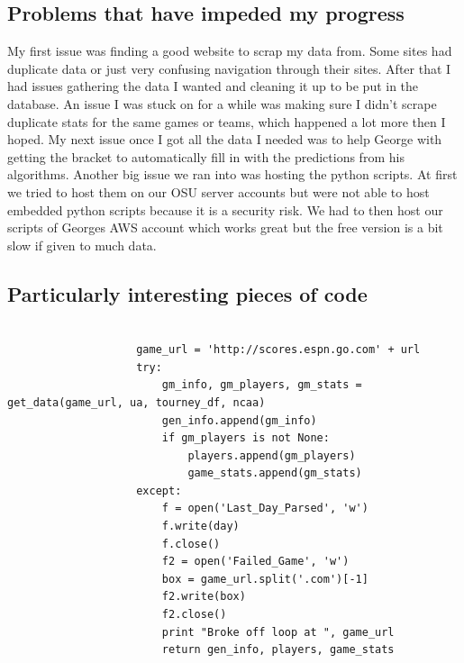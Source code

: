 \documentclass[onecolumn, draftclsnofoot,10pt, compsoc]{IEEEtran}
\begin{document}
\subsection{Problems that have impeded my progress}
My first issue was finding a good website to scrap my data from. Some sites had duplicate data or just very confusing navigation through their sites. After that I had issues gathering the data I wanted and cleaning it up to be put in the database. An issue I was stuck on for a while was making sure I didn’t scrape duplicate stats for the same games or teams, which happened a lot more then I hoped. My next issue once I got all the data I needed was to help George with getting the bracket to automatically fill in with the predictions from his algorithms. Another big issue we ran into was hosting the python scripts. At first we tried to host them on our OSU server accounts but were not able to host embedded python scripts because it is a security risk. We had to then host our scripts of Georges AWS account which works great but the free version is a bit slow if given to much data.

\subsection{Particularly interesting pieces of code}
\begin{lstlisting}[caption=Extract the data from the boxscore's url and store in gaame object, label=list3]

                    game_url = 'http://scores.espn.go.com' + url
                    try:
                        gm_info, gm_players, gm_stats = get_data(game_url, ua, tourney_df, ncaa)
                        gen_info.append(gm_info)
                        if gm_players is not None:
                            players.append(gm_players)
                            game_stats.append(gm_stats)
                    except:
                        f = open('Last_Day_Parsed', 'w')
                        f.write(day)
                        f.close()
                        f2 = open('Failed_Game', 'w')
                        box = game_url.split('.com')[-1]
                        f2.write(box)
                        f2.close()
                        print "Broke off loop at ", game_url
                        return gen_info, players, game_stats
\end{lstlisting}

 
\end{document}
